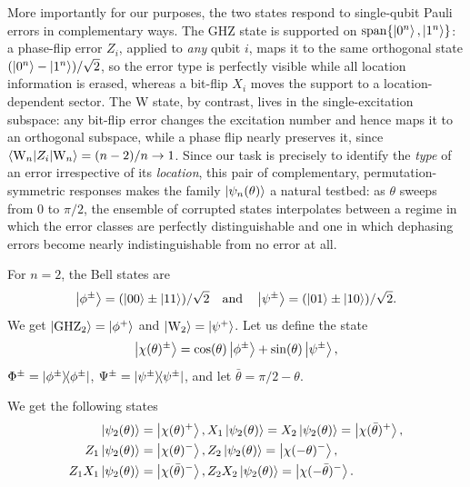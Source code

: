 More importantly for our purposes, the two states respond to single-qubit Pauli errors in complementary ways. 
The GHZ state is supported on $\mathrm{span}\{\ket{0^n}, \ket{1^n}\}$: a phase-flip error $Z_i$, applied to \emph{any} qubit $i$, maps it to the same orthogonal state $(\ket{0^n} - \ket{1^n})/\sqrt{2}$, so the error type is perfectly visible while all location information is erased, whereas a bit-flip $X_i$ moves the support to a location-dependent sector. 
The W state, by contrast, lives in the single-excitation subspace: any bit-flip error changes the excitation number and hence maps it to an orthogonal subspace, while a phase flip nearly preserves it, since $\braket{\mathrm{W}_n}{Z_i | \mathrm{W}_n} = (n-2)/n \to 1$. 
Since our task is precisely to identify the \emph{type} of an error irrespective of its \emph{location}, this pair of complementary, permutation-symmetric responses makes the family $\ket{\psi_n(\theta)}$ a natural testbed: as $\theta$ sweeps from $0$ to $\pi/2$, the ensemble of corrupted states interpolates between a regime in which the error classes are perfectly distinguishable and one in which dephasing errors become nearly indistinguishable from no error at all.

For $n=2$, the Bell states are 
\begin{equation*}
    \ket{\phi^\pm} = (\ket{00} \pm \ket{11})/\sqrt{2} \quad \text{and} \quad \ket{\psi^\pm} = (\ket{01} \pm \ket{10})/\sqrt{2}.
\end{equation*} 
We get $\ket{\mathrm{GHZ}_2} = \ket{\phi^+}$ and $\ket{\mathrm{W}_2} = \ket{\psi^+}$.
Let us define the state 
\begin{equation*}
    \ket{\chi(\theta)^\pm} = \cos(\theta) \ket{\phi^\pm} + \sin(\theta) \ket{\psi^\pm},
\end{equation*}
$\Phi^\pm = \ketbra{\phi^\pm}$, $\Psi^\pm = \ketbra{\psi^\pm}$, and let $\bar{\theta} = \pi/2 - \theta$.

We get the following states 
\begin{equation*}
    \begin{aligned}
        \ket{\psi_2(\theta)} &= \ket{\chi(\theta)^+}, X_1\ket{\psi_2(\theta)} = X_2\ket{\psi_2(\theta)} = \ket{\chi(\bar{\theta})^+}, \\
        Z_1\ket{\psi_2(\theta)} &= \ket{\chi(\theta)^-}, Z_2\ket{\psi_2(\theta)} = \ket{\chi(-\theta)^-}, \\
        Z_1 X_1 \ket{\psi_2(\theta)} &= \ket{\chi(\bar{\theta})^-}, Z_2 X_2 \ket{\psi_2(\theta)} = \ket{\chi(-\bar{\theta})^-}.
    \end{aligned}
\end{equation*}

